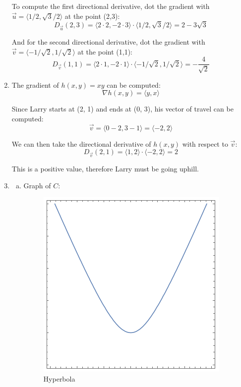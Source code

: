 \documentclass{article}
\begin{document}
\begin{enumerate}[1.]
    To compute the first directional derivative, dot the gradient with $\vec{u}
    = \langle 1/2, \sqrt{3}/2 \rangle$ at the point (2,3):
    $$ D_{\vec{u}}(2,3) = \langle 2 \cdot 2, -2 \cdot 3 \rangle \cdot \langle
    1/2, \sqrt{3}/2 \rangle = 2 - 3 \sqrt{3} $$

    And for the second directional derivative, dot the gradient with $\vec{v} =
    \langle -1/\sqrt{2}, 1/\sqrt{2} \rangle$ at the point (1,1):
    $$ D_{\vec{v}}(1,1) = \langle 2 \cdot 1, -2 \cdot 1 \rangle \cdot \langle
    -1/\sqrt{2}, 1/\sqrt{2} \rangle = -\frac{ 4 }{ \sqrt{2} }$$
  \item The gradient of $h(x, y) = xy$ can be computed:
    $$ \nabla h(x, y) = \langle y, x \rangle $$

    Since Larry starts at (2, 1) and ends at (0, 3), his vector of travel can be
    computed:
    $$ \vec{v} = \langle 0 - 2, 3 - 1 \rangle = \langle -2, 2 \rangle $$

    We can then take the directional derivative of $h(x, y)$ with respect to
    $\vec{v}$:
    $$ D_{\vec{v}}(2, 1) = \langle 1, 2 \rangle \cdot \langle -2, 2 \rangle = 2
    $$

    This is a positive value, therefore Larry must be going uphill.
  \item \begin{enumerate}[a.]
      \item Graph of $C$:

        \begin{figure}[H]
          \centering
          \includegraphics[scale=0.70]{"Hyperbola"}
          \caption{Hyperbola}
        \end{figure}


\end{enumerate}
\end{enumerate}
\end{document}
